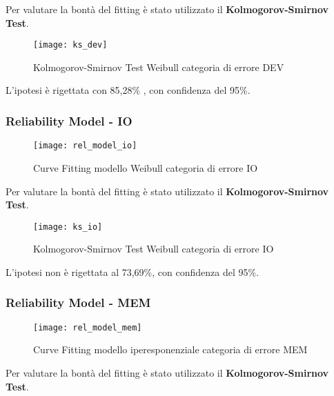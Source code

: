 Per valutare la bontà del fitting è stato utilizzato il \textbf{Kolmogorov-Smirnov Test}.\\

\begin{figure}[!htbp]
  \centering
  \texttt{[image: ks\_dev]}
  \caption{Kolmogorov-Smirnov Test Weibull categoria di errore DEV}
  \label{ks_dev}
\end{figure}

L'ipotesi è rigettata con 85,28\% , con confidenza del 95\%.\\

\clearpage

\subsubsection*{Reliability Model - IO}

\begin{figure}[!htbp]
  \centering
  \texttt{[image: rel\_model\_io]}
  \caption{Curve Fitting modello Weibull categoria di errore IO}
  \label{rel_model_io}
\end{figure}

Per valutare la bontà del fitting è stato utilizzato il \textbf{Kolmogorov-Smirnov Test}.\\

\begin{figure}[!htbp]
  \centering
  \texttt{[image: ks\_io]}
  \caption{Kolmogorov-Smirnov Test Weibull categoria di errore IO}
  \label{ks_io}
\end{figure}

L'ipotesi non è rigettata al 73,69\%, con confidenza del 95\%.\\

\clearpage
\subsubsection*{Reliability Model - MEM}

\begin{figure}[!htbp]
  \centering
  \texttt{[image: rel\_model\_mem]}
  \caption{Curve Fitting modello iperesponenziale categoria di errore MEM}
  \label{rel_model_mem}
\end{figure}

Per valutare la bontà del fitting è stato utilizzato il \textbf{Kolmogorov-Smirnov Test}.\\


